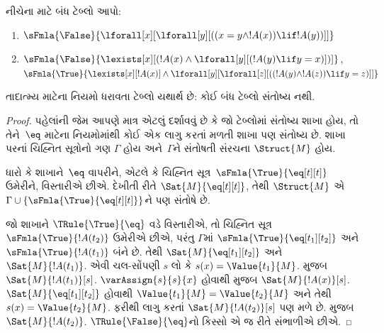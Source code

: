\begin{prob}
નીચેના માટે બંધ ટેબ્લો આપો:
\begin{enumerate}
\item $\sFmla{\False}{\lforall[x][\lforall[y][((x = y \land !A(x))
      \lif !A(y))]]}$
\item $\sFmla{\False}{\lexists[x][(!A(x) \land
    \lforall[y][(!A(y) \lif y = x)])]}$,\\
  $\sFmla{\True}{\lexists[x][!A(x)] \land
    \lforall[y][\lforall[z][((!A(y) \land !A(z)) \lif y = z)]]}$
\end{enumerate}
\end{prob}
\endgroup

  \begingroup
\makeatletter{}\makeatother


\label{guunit:OLP-0111}


\begin{prop}
તાદાત્મ્ય માટેના નિયમો ધરાવતા ટેબ્લો યથાર્થ છે: કોઈ બંધ
ટેબ્લો સંતોષ્ય નથી.
\end{prop}

\begin{proof}
પહેલાંની જેમ આપણે માત્ર એટલું દર્શાવવું છે કે જો ટેબ્લોમાં
સંતોષ્ય શાખા હોય, તો તેને~$\eq$ માટેના નિયમોમાંથી કોઈ એક લાગુ કરતાં
મળતી શાખા પણ સંતોષ્ય છે. શાખા પરનાં ચિહ્નિત સૂત્રોનો ગણ
$\Gamma$ હોય અને~$\Gamma$ને સંતોષતી સંરચના $\Struct{M}$ હોય.

ધારો કે શાખાને~$\eq$ વાપરીને, એટલે કે ચિહ્નિત
સૂત્ર~$\sFmla{\True}{\eq[t][t]}$ ઉમેરીને, વિસ્તારીએ છીએ. દેખીતી
રીતે $\Sat{M}{\eq[t][t]}$, તેથી $\Struct{M}$ એ
$\Gamma \cup \{\sFmla{\True}{\eq[t][t]}\}$ને પણ સંતોષે છે.

જો શાખાને $\TRule{\True}{\eq}$ વડે વિસ્તારીએ, તો ચિહ્નિત
સૂત્ર~$\sFmla{\True}{!A(t_2)}$ ઉમેરીએ છીએ, પરંતુ $\Gamma$માં
$\sFmla{\True}{\eq[t_1][t_2]}$ અને $\sFmla{\True}{!A(t_1)}$ બંને છે.
તેથી $\Sat{M}{\eq[t_1][t_2]}$ અને $\Sat{M}{!A(t_1)}$. એવી ચલ-સોંપણી
$s$ લો કે $s(x) = \Value{t_1}{M}$.
 મુજબ
$\Sat{M}{!A(t_1)}[s]$. $\varAssign{s}{s}{x}$ હોવાથી
 મુજબ $\Sat{M}{!A(x)}[s]$.
$\Sat{M}{\eq[t_1][t_2]}$ હોવાથી
$\Value{t_1}{M} = \Value{t_2}{M}$ અને તેથી
$s(x) = \Value{t_2}{M}$. ફરીથી
 લાગુ કરતાં
$\Sat{M}{!A(t_2)}[s]$ પણ મળે છે.
 મુજબ $\Sat{M}{!A(t_2)}$.
$\TRule{\False}{\eq}$નો કિસ્સો એ જ રીતે સંભાળીએ છીએ.
\end{proof}
\endgroup


